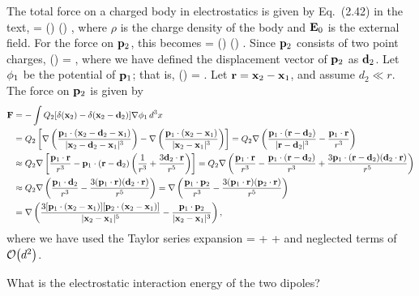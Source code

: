 \begin{solution}
	The total force on a charged body in electrostatics is given by Eq.~(2.42) in the text,
	\beq
		\vF = \int \rho(\vx) \vEo(\vx) \dcx,
	\eeq
	where $\rho$ is the charge density of the body and $\mathbf{E}_0$ is the external field.  For the force on $\mathbf{p}_2$, this becomes
	\beq
		\vF = \int \rhow(\vx) \vEo(\vx) \dcx.
	\eeq
	Since $\mathbf{p}_2$ consists of two point charges,
	\beqn \label{rho1}
		\rhow(\vx) = \Qw [\delta(\vxw) - \delta(\vxw - \vdw)],
	\eeqn
	where we have defined the displacement vector of $\mathbf{p}_2$ as $\mathbf{d}_2$.  Let $\phi_1$ be the potential of $\mathbf{p}_1$; that is,
	\beqn \label{phi1}
		\phiq(\vx) = .
	\eeqn
	Let $\mathbf{r} = \mathbf{x}_2 - \mathbf{x}_1$, and assume $d_2 \ll r$.  The force on $\mathbf{p}_2$ is given by
	\begin{align*}
		\mathbf{F} &= -\int Q_2 [\delta(\mathbf{x}_2) - \delta(\mathbf{x}_2 - \mathbf{d}_2)] \nabla \phi_1 \dd[3]{x} \\
		&= Q_2 \left[ \nabla \left( \frac{\mathbf{p}_1 \cdot (\mathbf{x}_2 - \mathbf{d}_2 - \mathbf{x}_1)}{|\mathbf{x}_2 - \mathbf{d}_2 - \mathbf{x}_1|^3} \right) - \nabla \left( \frac{\mathbf{p}_1 \cdot (\mathbf{x}_2 - \mathbf{x}_1)}{|\mathbf{x}_2 - \mathbf{x}_1|^3} \right) \right]
		= Q_2 \nabla \left( \frac{\mathbf{p}_1 \cdot (\mathbf{r} - \mathbf{d}_2)}{|\mathbf{r} - \mathbf{d}_2|^3} - \frac{\mathbf{p}_1 \cdot \mathbf{r}}{r^3} \right) \\
		&\approx Q_2 \nabla \left[ \frac{\mathbf{p}_1 \cdot \mathbf{r}}{r^3} - \mathbf{p}_1 \cdot (\mathbf{r} - \mathbf{d}_2) \left( \frac{1}{r^3} + \frac{3 \mathbf{d}_2 \cdot \mathbf{r}}{r^5} \right) \right]
		= Q_2 \nabla \left( \frac{\mathbf{p}_1 \cdot \mathbf{r}}{r^3} - \frac{\mathbf{p}_1 \cdot (\mathbf{r} - \mathbf{d}_2)}{r^3} + \frac{3 \mathbf{p}_1 \cdot (\mathbf{r} - \mathbf{d}_2) (\mathbf{d}_2 \cdot \mathbf{r})}{r^5} \right) \\
		&\approx Q_2 \nabla \left( \frac{\mathbf{p}_1 \cdot \mathbf{d}_2}{r^3} - \frac{3(\mathbf{p}_1 \cdot \mathbf{r})(\mathbf{d}_2 \cdot \mathbf{r})}{r^5} \right)
		= \nabla \left( \frac{\mathbf{p}_1 \cdot \mathbf{p}_2}{r^3} - \frac{3(\mathbf{p}_1 \cdot \mathbf{r})(\mathbf{p}_2 \cdot \mathbf{r})}{r^5} \right) \\
		&= \nabla \left( \frac{3[\mathbf{p}_1 \cdot (\mathbf{x}_2 - \mathbf{x}_1)][\mathbf{p}_2 \cdot (\mathbf{x}_2 - \mathbf{x}_1)]}{|\mathbf{x}_2 - \mathbf{x}_1|^5} - \frac{\mathbf{p}_1 \cdot \mathbf{p}_2}{|\mathbf{x}_2 - \mathbf{x}_1|^3} \right),
	\end{align*}
	where we have used the Taylor series expansion
	\beq
		 =  +  + \cdots
	\eeq
	and neglected terms of $\order{d^2}$.
\end{solution}


\begin{problem}
	What is the electrostatic interaction energy of the two dipoles?
\end{problem}

